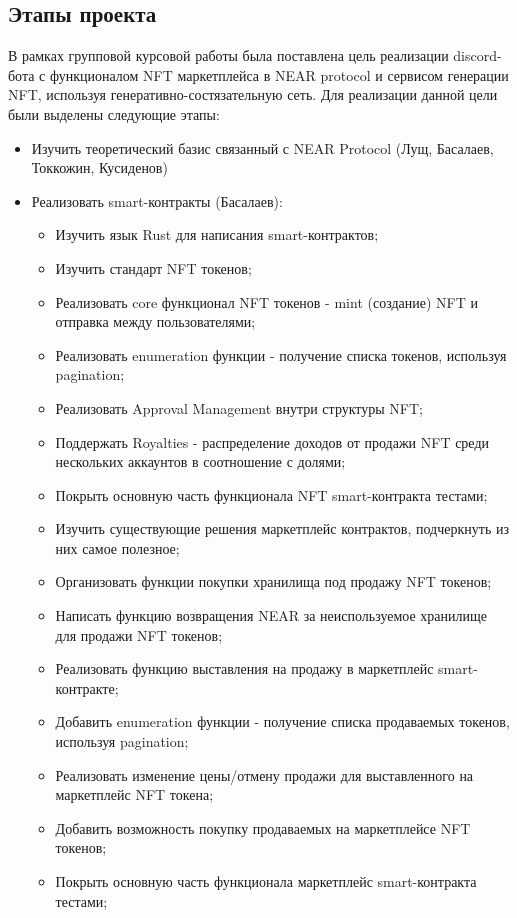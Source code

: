 \subsection{Этапы проекта}
В рамках групповой курсовой работы была поставлена цель реализации discord-бота с функционалом NFT маркетплейса в NEAR protocol и сервисом генерации NFT, используя генеративно-состязательную сеть. Для реализации данной цели были выделены следующие этапы:
\begin{itemize}
    \item Изучить теоретический базис связанный с NEAR Protocol (Лущ, Басалаев, Токкожин, Кусиденов)
    \item Реализовать smart-контракты (Басалаев):
    \begin{itemize}
        \item Изучить язык Rust для написания smart-контрактов;
        \item Изучить стандарт NFT токенов;
        \item Реализовать core функционал NFT токенов - mint (создание) NFT и отправка между пользователями;
        \item Реализовать enumeration функции - получение списка токенов, используя pagination;
        \item Реализовать Approval Management внутри структуры NFT;
        \item Поддержать Royalties - распределение доходов от продажи NFT среди нескольких аккаунтов в соотношение с долями;
        \item Покрыть основную часть функционала NFT smart-контракта тестами;
        \item Изучить существующие решения маркетплейс контрактов, подчеркнуть из них самое полезное;
        \item Организовать функции покупки хранилища под продажу NFT токенов;
        \item Написать функцию возвращения NEAR за неиспользуемое хранилище для продажи NFT токенов;
        \item Реализовать функцию выставления на продажу в маркетплейс smart-контракте;
        \item Добавить enumeration функции - получение списка продаваемых токенов, используя pagination;
        \item Реализовать изменение цены/отмену продажи для выставленного на маркетплейс NFT токена;
        \item Добавить возможность покупку продаваемых на маркетплейсе NFT токенов;
        \item Покрыть основную часть функционала маркетплейс smart-контракта тестами;

\end{itemize}
\end{itemize}
